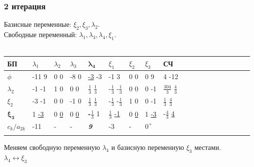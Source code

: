\documentclass[14pt,a4paper,fleqn]{extarticle}
\begin{document}
\subsubsection*{2 итерация}
Базисные переменные: $\xi_2, \xi_3, \lambda_2$.\\
Свободные переменный: $\lambda_1, \lambda_3, \lambda_4, \xi_1$.\\\\
\begin{tabularx}{\textwidth}{V{1}p{1.2cm}V{1}p{1.2cm}V{1}p{1.2cm}V{1}p{1.1cm}V{7}p{1.2cm}V{7}p{1.2cm}V{1}p{1.2cm}V{1}p{1.2cm}V{1}p{1.5cm}V{1}}
	\hline
	
	БП & $\lambda_1$ & $\lambda_2$ & $\lambda_3$ & $\boldsymbol{\lambda_4}$ & $\xi_1$ & $\xi_2$ & $\xi_3$ & СЧ\\
	
	\hline
	
	$\phi$ & \small -11 \scriptsize 9 & \small 0 \scriptsize 0 & -8 \scriptsize 0 & \small \underline{-3}  \scriptsize -3 & -1 \scriptsize 3 & 0 \scriptsize 0 & 0 \scriptsize 9 & \small 4 \scriptsize -12\\
	
	\hline
	
	$\lambda_2$ & \small -1 \scriptsize -1 & \small 1 \scriptsize 0 & 0 \scriptsize 0 & \small \underline{$\frac{1}{3}$} \scriptsize $\frac{1}{3}$ & \small -$\frac{1}{3}$ \scriptsize -$\frac{1}{3}$ & 0 \scriptsize 0 & 0 \scriptsize -1 & \small $\frac{304}{3}$ \scriptsize $\frac{4}{3}$\\
	
	\hline
	
	$\xi_2$ & \small -3 \scriptsize -1 & \small 0 \scriptsize 0 & -1 \scriptsize 0 & \small \underline{$\frac{1}{3}$} \scriptsize $\frac{1}{3}$ & -$\frac{1}{3}$ \scriptsize -$\frac{1}{3}$ & 1 \scriptsize 0 & 0 \scriptsize -1 & \small $\frac{1}{3}$ \scriptsize $\frac{4}{3}$\\
	
	\Xhline{7\arrayrulewidth}
	
	$\boldsymbol{\xi_3}$ & \small 1 \scriptsize \underline{-3} & \small 0 \scriptsize \underline{0} & 0 \scriptsize \underline{0} & \small \textbf{-$\frac{1}{3}$} \scriptsize 1 & $\frac{1}{3}$ \scriptsize \underline{-1} & 0 \scriptsize \underline{0} & 1 \scriptsize \underline{-3} & \small -$\frac{4}{3}$ \scriptsize \underline{4}\\
	
	\Xhline{7\arrayrulewidth}
	
	$c_k/a_{2k}$& \small -11 & - & - & \textit{\textbf{9}} & -3 & - & \small $0^+$ &\\
	
	\hdashline
\end{tabularx}
\newline\newline
Меняем свободную переменную $\lambda_4$ и базисную переменную $\xi_3$ местами.\\
$\lambda_4 \leftrightarrow \xi_3$
\end{document}
